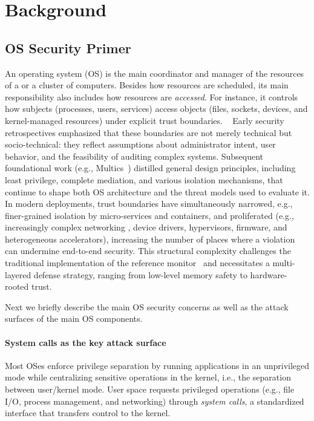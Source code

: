 \section{Background}
\subsection{OS Security Primer}
\label{sec:bkgd:os}

An operating system (OS) is the main coordinator and manager of the resources of a  or a cluster of computers.
Besides how resources are scheduled, its main responsibility also includes how resources are \textit{accessed}. 
For instance, it controls how subjects (processes, users, services) access objects (files, sockets, devices, and kernel-managed resources) under explicit trust boundaries. 
~
Early security retrospectives emphasized that these boundaries are not merely technical but socio-technical: they reflect assumptions about administrator intent, user behavior, and the feasibility of auditing complex systems\cite{anderson1972computer}. 
Subsequent foundational work (e.g., Multics~\cite{corbato1965introduction}) distilled general design principles, including least privilege, complete mediation, and various isolation mechanisms, that continue to shape both OS architecture and the threat models used to evaluate it\cite{lampson1974protection,saltzer1975protection}. 
In modern deployments, trust boundaries have simultaneously narrowed, e.g., finer-grained isolation by micro-services and containers, and proliferated (e.g., increasingly complex networking , device drivers, hypervisors, firmware, and heterogeneous accelerators), increasing the number of places where a violation can undermine end-to-end security.
This structural complexity challenges the traditional implementation of the reference monitor~\cite{anderson1972computer} and necessitates a multi-layered defense strategy, ranging from low-level memory safety to hardware-rooted trust.

Next we briefly describe the main OS security concerns as well as the attack surfaces of the main OS components. 

\paragraph{\textbf{System calls as the key attack surface}}
Most OSes enforce privilege separation by running applications in an unprivileged mode while centralizing sensitive operations in the kernel, i.e., the separation between user/kernel mode. User space requests privileged operations (e.g., file I/O, process management, and networking) through \textit{system calls}, a standardized interface that transfers control to the kernel.

